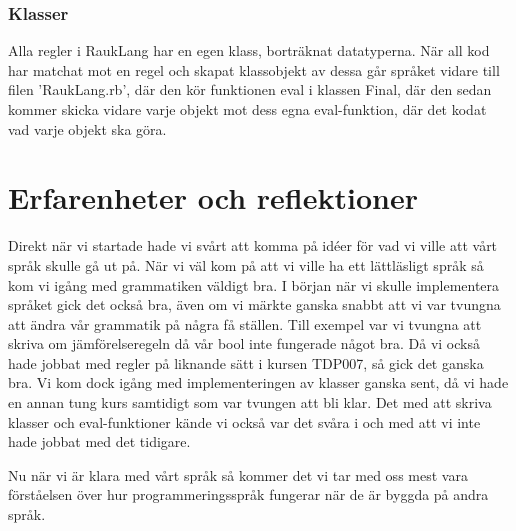 \documentclass[12pt]{TDP019}
\begin{document}
\subsubsection{Klasser}
Alla regler i RaukLang har en egen klass, borträknat datatyperna. När all kod har matchat mot en regel och skapat klassobjekt av dessa går språket vidare till filen 'RaukLang.rb', där den kör funktionen eval i klassen Final, där den sedan kommer skicka vidare varje objekt mot dess egna eval-funktion, där det kodat vad varje objekt ska göra.

\newpage
\section{Erfarenheter och reflektioner}
Direkt när vi startade hade vi svårt att komma på idéer för vad vi ville att vårt språk skulle gå ut på. När vi väl kom på att vi ville ha ett lättläsligt språk så kom vi igång med grammatiken väldigt bra. I början när vi skulle implementera språket gick det också bra, även om vi märkte ganska snabbt att vi var tvungna att ändra vår grammatik på några få ställen. Till exempel var vi tvungna att skriva om jämförelseregeln då vår bool inte fungerade något bra. Då vi också hade jobbat med regler på liknande sätt i kursen TDP007, så gick det ganska bra. Vi kom dock igång med implementeringen av klasser ganska sent, då vi hade en annan tung kurs samtidigt som var tvungen att bli klar. Det med att skriva klasser och eval-funktioner kände vi också var det svåra i och med att vi inte hade jobbat med det tidigare.

Nu när vi är klara med vårt språk så kommer det vi tar med oss mest vara förståelsen över hur programmeringsspråk fungerar när de är byggda på andra språk.
\end{document}
